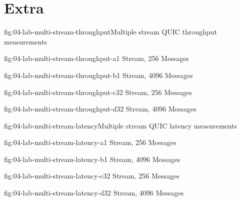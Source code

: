 \section{Extra}

\begin{myFigure}{fig:04-lab-multi-stream-throughput}{Multiple stream QUIC throughput measurements}
\begin{mySubfigure}{0.49\linewidth}{fig:04-lab-multi-stream-throughput-a}{1 Stream, \SI{256}{\byte} Messages}
\footnotesize

\end{mySubfigure}
\begin{mySubfigure}{0.49\linewidth}{fig:04-lab-multi-stream-throughput-b}{1 Stream, \SI{4096}{\byte} Messages}
\footnotesize

\end{mySubfigure}

\begin{mySubfigure}{0.49\linewidth}{fig:04-lab-multi-stream-throughput-c}{32 Stream, \SI{256}{\byte} Messages}
\footnotesize

\end{mySubfigure}
\begin{mySubfigure}{0.49\linewidth}{fig:04-lab-multi-stream-throughput-d}{32 Stream, \SI{4096}{\byte} Messages}
\footnotesize

\end{mySubfigure}
\end{myFigure}


\begin{myFigure}{fig:04-lab-multi-stream-latency}{Multiple stream QUIC latency measurements}
\begin{mySubfigure}{0.49\linewidth}{fig:04-lab-multi-stream-latency-a}{1 Stream, \SI{256}{\byte} Messages}
\footnotesize

\end{mySubfigure}
\begin{mySubfigure}{0.49\linewidth}{fig:04-lab-multi-stream-latency-b}{1 Stream, \SI{4096}{\byte} Messages}
\footnotesize

\end{mySubfigure}

\begin{mySubfigure}{0.49\linewidth}{fig:04-lab-multi-stream-latency-c}{32 Stream, \SI{256}{\byte} Messages}
\footnotesize

\end{mySubfigure}
\begin{mySubfigure}{0.49\linewidth}{fig:04-lab-multi-stream-latency-d}{32 Stream, \SI{4096}{\byte} Messages}
\footnotesize

\end{mySubfigure}
\end{myFigure}

